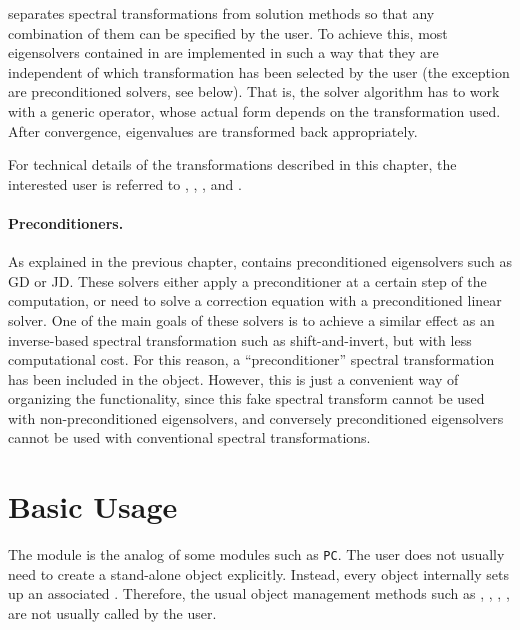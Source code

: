 	\slepc separates spectral transformations from solution methods so that any combination of them can be specified by the user. To achieve this, most eigensolvers contained in  are implemented in such a way that they are independent of which transformation has been selected by the user (the exception are preconditioned solvers, see below). That is, the solver algorithm has to work with a generic operator, whose actual form depends on the transformation used. After convergence, eigenvalues are transformed back appropriately.

	For technical details of the transformations described in this chapter, the interested user is referred to \citep{Ericsson:1980:STL}, \citep{Scott:1982:AIO}, \citep{Nour-Omid:1987:HIS}, and \citep{Meerbergen:1994:SCT}.

\paragraph{Preconditioners.}

As explained in the previous chapter,  contains preconditioned eigensolvers such as GD or JD. These solvers either apply a preconditioner at a certain step of the computation, or need to solve a correction equation with a preconditioned linear solver. One of the main goals of these solvers is to achieve a similar effect as an inverse-based spectral transformation such as shift-and-invert, but with less computational cost. For this reason, a ``preconditioner'' spectral transformation has been included in the  object. However, this is just a convenient way of organizing the functionality, since this fake spectral transform cannot be used with non-preconditioned eigensolvers, and conversely preconditioned eigensolvers cannot be used with conventional spectral transformations.

\section{Basic Usage}

	The  module is the analog of some \petsc modules such as \texttt{PC}. The user does not usually need to create a stand-alone  object explicitly. Instead, every  object internally sets up an associated . Therefore, the usual object management methods such as , , , , are not usually called by the user.


